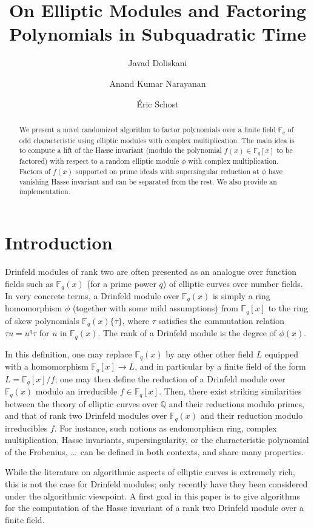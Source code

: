 \documentclass[12pt]{article}
\title{On Elliptic Modules and Factoring Polynomials in Subquadratic Time}
\author[1]{Javad Doliskani}
\author[2]{Anand Kumar Narayanan}
\author[3]{\'Eric Schost}
\affil[1]{\small Institute for Quantum Computing, University of Waterloo}
\affil[2]{\small Computing and Mathematical Sciences, Caltech}
\affil[3]{\small Computer Science Department, University of Waterloo}
\date{}
\theoremstyle{plain}
\theoremstyle{definition}
\newcommand{\ang}[1]{\{#1\}}
\def\Q{\ensuremath{\mathbb{Q}}}
\def\F{\ensuremath{\mathbb{F}}}
\begin{document}
\maketitle

\begin{abstract}
	We present a novel randomized algorithm to factor polynomials over a finite field $\F_q$ of odd 
	characteristic using elliptic modules with complex multiplication. The main idea is to compute a
	lift of the Hasse invariant (modulo the polynomial $f(x) \in \F_q[x]$ to be factored) with 
	respect to a random elliptic module $\phi$ with complex multiplication. Factors of $f(x)$  
	supported on prime ideals with supersingular reduction at $\phi$ have vanishing Hasse invariant
	and can be separated from the rest. We also provide an implementation.
\end{abstract}



\section{Introduction}

Drinfeld modules of rank two are often presented as an analogue over
function fields such as $\F_q(x)$ (for a prime power $q$) of elliptic
curves over number fields. In very concrete terms, a Drinfeld module
over $\F_q(x)$ is simply a ring homomorphism $\phi$ (together with
some mild assumptions) from $\F_q[x]$ to the ring of skew polynomials
$\F_q(x)\ang{\tau}$, where $\tau$ satisfies the commutation
relation $\tau u = u^q \tau$ for $u$ in $\F_q(x)$. The rank of a
Drinfeld module is the degree of $\phi(x)$.

In this definition, one may replace $\F_q(x)$ by any other other field
$L$ equipped with a homomorphism $\F_q[x]\to L$, and in particular by
a finite field of the form $L=\F_q[x]/f$; one may then define the {\rm
  reduction} of a Drinfeld module over $\F_q(x)$ modulo an irreducible
$f \in \F_q[x]$. Then, there exist striking similarities between the
theory of elliptic curves over $\Q$ and their reductions modulo primes,
and that of rank two Drinfeld modules over $\F_q(x)$ and their
reduction modulo irreducibles $f$. For instance, such notions as
endomorphism ring, complex multiplication, Hasse invariants,
supersingularity, or the characteristic polynomial of the Frobenius,
\dots~can be defined in both contexts, and share many
properties.

While the literature on algorithmic aspects of elliptic curves is
extremely rich, this is not the case for Drinfeld modules; only
recently have they been considered under the algorithmic viewpoint.  A
first goal in this paper is to give algorithms for the computation of
the Hasse invariant of a rank two Drinfeld module over a finite field.
\end{document}
